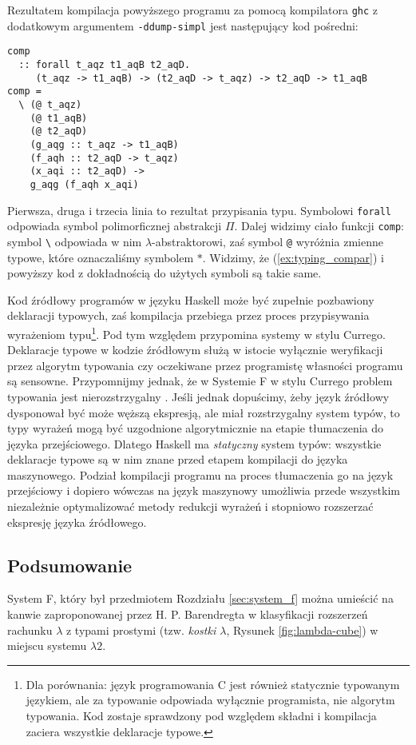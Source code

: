 Rezultatem kompilacja powyższego programu za pomocą kompilatora \texttt{ghc} z dodatkowym argumentem \texttt{-ddump-simpl} jest następujący kod pośredni:

\begin{verbatim}
comp
  :: forall t_aqz t1_aqB t2_aqD.
     (t_aqz -> t1_aqB) -> (t2_aqD -> t_aqz) -> t2_aqD -> t1_aqB
comp =
  \ (@ t_aqz)
    (@ t1_aqB)
    (@ t2_aqD)
    (g_aqg :: t_aqz -> t1_aqB)
    (f_aqh :: t2_aqD -> t_aqz)
    (x_aqi :: t2_aqD) ->
    g_aqg (f_aqh x_aqi)
\end{verbatim}

Pierwsza, druga i trzecia linia to rezultat przypisania typu. Symbolowi \texttt{forall} odpowiada symbol polimorficznej abstrakcji \(\Pi\). Dalej widzimy ciało funkcji \texttt{comp}: symbol \texttt{\textbackslash} odpowiada w nim \(\lambda\)-abstraktorowi, zaś symbol \texttt{@} wyróżnia zmienne typowe, które oznaczaliśmy symbolem \(\ast\). Widzimy, że (\ref{ex:typing_compar}) i powyższy kod z dokładnością do użytych symboli są takie same.

Kod źródłowy programów w języku Haskell może być zupełnie pozbawiony deklaracji typowych, zaś kompilacja przebiega przez proces przypisywania wyrażeniom typu\footnote{Dla porównania: język programowania C jest również statycznie typowanym językiem, ale za typowanie odpowiada wyłącznie programista, nie algorytm typowania. Kod zostaje sprawdzony pod względem składni i kompilacja zaciera wszystkie deklaracje typowe.}. Pod tym względem przypomina systemy w stylu Currego. Deklaracje typowe w kodzie źródłowym służą w istocie wyłącznie weryfikacji przez algorytm typowania czy oczekiwane przez programistę własności programu są sensowne. Przypomnijmy jednak, że w Systemie F w stylu Currego problem typowania jest nierozstrzygalny \cite{Wells_98}. Jeśli jednak dopuścimy, żeby język źródłowy dysponował być może węższą ekspresją, ale miał rozstrzygalny system typów, to typy wyrażeń mogą być uzgodnione algorytmicznie na etapie tłumaczenia do języka przejściowego. Dlatego Haskell ma \emph{statyczny} system typów: wszystkie deklaracje typowe są w nim znane przed etapem kompilacji do języka maszynowego. Podział kompilacji programu na proces tłumaczenia go na język przejściowy i dopiero wówczas na język maszynowy umożliwia przede wszystkim niezależnie optymalizować metody redukcji wyrażeń i stopniowo rozszerzać ekspresję języka źródłowego.

\subsection{Podsumowanie}
System F, który był przedmiotem Rozdziału \ref{sec:system_f} można umieścić na kanwie zaproponowanej przez H. P. Barendregta w \cite[Rozdział 5]{Barendregt_1992} klasyfikacji rozszerzeń rachunku \(\lambda\) z typami prostymi (tzw. \emph{kostki \(\lambda\)}, Rysunek \ref{fig:lambda-cube}) w miejscu systemu \(\lambda 2\). 

